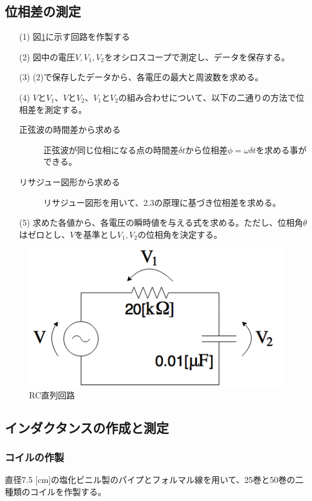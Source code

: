 \documentclass[dvipdfmx]{jsarticle}
\begin{document}
\subsection{位相差の測定}
\begin{itemize}
  \item [(1)]図\ref{fig:experimental_circuit2}に示す回路を作製する
  \item [(2)]図中の電圧$V, V_1, V_2$をオシロスコープで測定し、データを保存する。
  \item [(3)](2)で保存したデータから、各電圧の最大と周波数を求める。
  \item [(4)]$VとV_1、VとV_2、V_1とV_2の組み合わせについて$、以下の二通りの方法で位相差を測定する。
    \begin{description}
      \item [正弦波の時間差から求める]正弦波が同じ位相になる点の時間差$\delta t$から位相差$\phi = \omega \delta t$を求める事ができる。
      \item [リサジュー図形から求める]リサジュー図形を用いて、2.3の原理に基づき位相差を求める。
    \end{description}
  \item[(5)]求めた各値から、各電圧の瞬時値を与える式を求める。ただし、位相角$\theta$はゼロとし、$V$を基準とし$V_1, V_2$の位相角を決定する。
\end{itemize}
\begin{figure}[h]
  \centering
  \includegraphics[scale=0.4]{experimental_circuit2.png}
  \caption{RC直列回路}
  \label{fig:experimental_circuit2}
\end{figure}

\subsection{インダクタンスの作成と測定}
\subsubsection{コイルの作製}
直径7.5 [cm]の塩化ビニル製のパイプとフォルマル線を用いて、25巻と50巻の二種類のコイルを作製する。
\end{document}
